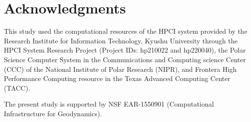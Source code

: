 \section*{Acknowledgments}
This study used the computational resources of the HPCI system provided by the Research Institute for Information Technology, Kyushu University through the HPCI System Research Project (Project IDs: hp210022 and hp220040), the Polar Science Computer System in the Communications and Computing science Center (CCC) of the National Institute of Polar Research (NIPR), and Frontera High Performance Computing resource in the Texas Advanced Computing Center (TACC). 

The present study is supported by NSF EAR-1550901 (Computational Infrastructure for Geodynamics).
